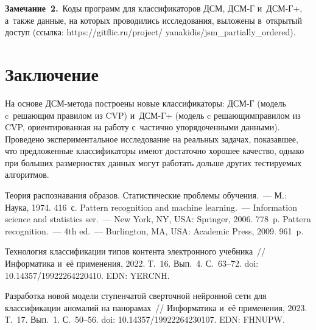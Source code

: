 \begin{multicols}{2}
  \smallskip
  
  \noindent
  \textbf{Замечание~2.}\ Коды программ для классификаторов ДСМ, ДСМ-Г 
и~ДСМ-Г+, а~также данные, на которых проводились исследования, выложены 
в~открытый доступ (ссылка: {\sf 
https://gitflic.ru/project/ yanakidis/jsm\_partially\_ordered}).

\vspace*{-6pt}

\section{Заключение }

\vspace*{-3pt}

  На основе ДСМ-метода построены новые классификаторы: ДСМ-Г (модель 
c~решающим правилом из CVP) и~ДСМ-Г+ (модель c решающим\linebreak правилом из 
CVP, ориентированная на работу с~час\-тич\-но упорядоченными данными). 
Проведено эксперимен\-таль\-ное исследование на реальных задачах, показавшее, 
что предложенные классификаторы имеют достаточно хорошее качество, 
однако при больших размерностях данных могут работать дольше других 
тестируемых алгоритмов.
   
{\small\frenchspacing
 { %
 \begin{thebibliography}{99} 
 Теория распознавания образов. Статистические 
проблемы обучения.~--- М.: Наука, 1974. 416~с.
 Pattern recognition and machine learning.~--- Information science and statistics 
ser.~--- New York, NY, USA: Springer, 2006. 778~p.
 Pattern recognition.~--- 4th ed.~--- Burlington, MA, USA: Academic Press, 2009. 961~p.

 Технология классификации типов контента электронного 
учебника~// Информатика и~её применения, 2022. Т.~16. Вып.~4. С.~63--72. doi: 
10.14357/19922264220410. EDN: YERCNH.

 Разработка новой модели 
ступенчатой сверточной нейронной сети для классификации аномалий на 
панорамах~// Информатика и~её применения, 2023. Т.~17. Вып.~1. С.~50--56.  doi: 
10.14357/19922264230107. EDN: FHNUPW.


\end{thebibliography}}}
\end{multicols}
